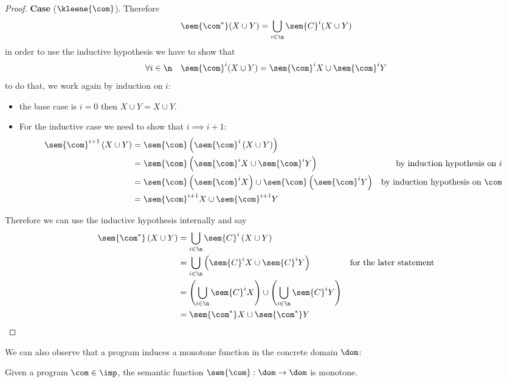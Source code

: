 \begin{proof}
  \medskip

  \noindent
  \textbf{Case} (\(\kleene{\com}\)). Therefore
  \[\sem{\com^*}(X\cup Y) = \bigcup_{i\in\n}\sem{C}^i(X\cup Y)\] in
  order to use the inductive hypothesis we have to show
  that
  \[\forall i \in \n \quad \sem{\com}^i(X \cup Y) = \sem{\com}^i X
    \cup \sem{\com}^i Y\] to do that, we work again by induction on
  \(i\):
  \begin{itemize}
  \item the base case is \(i = 0\) then \(X \cup Y = X \cup Y\).
  \item For the inductive case we need to show that
    \(i \implies i+1\):
    \begin{align*}
      \sem{\com}^{i+1}\left(X\cup Y\right) & = \sem{\com}\left(\sem{\com}^i \left(X \cup Y\right)\right) \\
                                           & = \sem{\com}\left(\sem{\com}^iX \cup \sem{\com}^iY\right) & \text{by induction hypothesis on } i \\
                                           & = \sem{\com}\left(\sem{\com}^iX\right) \cup \sem{\com}\left(\sem{\com}^iY\right) & \text{by induction hypothesis on } \com \\
                                           & = \sem{\com}^{i+1}X \cup \sem{\com}^{i+1}Y
    \end{align*}
  \end{itemize}
  Therefore we can use the inductive hypothesis internally and say
  \begin{align*}
    \sem{\com^*}\left(X\cup Y\right) & = \bigcup_{i\in\n}\sem{C}^i\left(X\cup Y\right) \\
                                     & = \bigcup_{i\in\n}\left(\sem{C}^iX \cup \sem{C}^iY\right) & \text{for the later statement} \\
                                     & = \left(\bigcup_{i\in\n}\sem{C}^iX\right) \cup \left(\bigcup_{i\in\n}\sem{C}^iY\right) \\
                                     & = \sem{\com^*}X \cup \sem{\com^*}Y \qedhere
  \end{align*}
\end{proof}

We can also observe that a program induces a monotone function in the
concrete domain \(\dom\):

\begin{lemma}
  Given a program \(\com\in\imp\), the semantic function
  \(\sem{\com} : \dom \to \dom\) is monotone.
\end{lemma}

